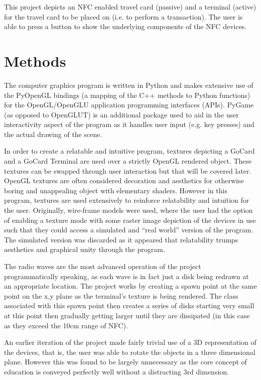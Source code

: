 \documentclass[a4paper]{article}
\begin{document}
This project depicts an NFC enabled travel card (passive) and a terminal (active) for the travel card to be placed on (i.e. to perform a transaction). The user is able to press a button to show the underlying components of the NFC devices. 


\section{Methods}
The computer graphics program is written in Python and makes extensive use of the PyOpenGL bindings (a mapping of the C++ methods to Python functions) for the OpenGL/OpenGLU application programming interfaces (APIs). PyGame (as opposed to OpenGLUT) is an additional package used to aid in the user interactivity aspect of the program as it handles user input (e.g. key presses) and the actual drawing of the scene. 

In order to create a relatable and intuitive program, textures depicting a GoCard and a GoCard Terminal are used over a strictly OpenGL rendered object. These textures can be swapped through user interaction but that will be covered later. OpenGL textures are often considered decoration and aesthetics for otherwise boring and unappealing object with elementary shaders. However in this program, textures are used extensively to reinforce relatability and intuition for the user. Originally, wire-frame models were used, where the user had the option of enabling a texture mode with some raster image depiction of the devices in use such that they could access a simulated and ``real world'' version of the program. The simulated version was discarded as it appeared that relatability trumps aesthetics and graphical unity through the program. 

The radio waves are the most advanced operation of the project programmatically speaking, as each wave is in fact just a disk being redrawn at an appropriate location. The project works by creating a spawn point at the same point on the x,y plane as the terminal's texture is being rendered. The class associated with this spawn point then creates a series of disks starting very small at this point then gradually getting larger until they are dissipated (in this case as they exceed the 10cm range of NFC).

An earlier iteration of the project made fairly trivial use of a 3D representation of the devices, that is, the user was able to rotate the objects in a three dimensional plane. However this was found to be largely unnecessary as the core concept of education is conveyed perfectly well without a distracting 3rd dimension. 
\end{document}
